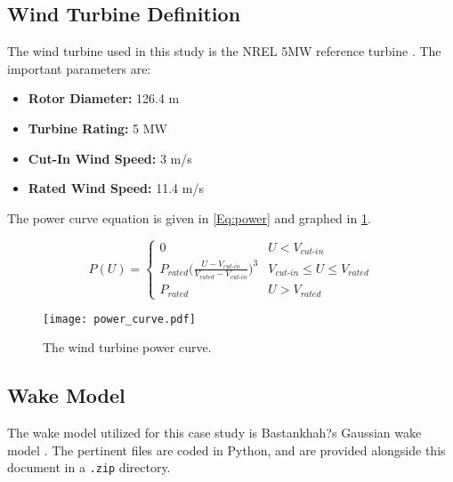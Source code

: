 \documentclass[12pt]{article}
\begin{document}
\subsection{Wind Turbine Definition}
    The wind turbine used in this study is the NREL 5MW reference turbine \cite{5MW}. The important parameters are:
    
    \begin{itemize}
        \item \textbf{Rotor Diameter:} 126.4 m
        \item \textbf{Turbine Rating:} 5 MW
        \item \textbf{Cut-In Wind Speed:} 3 m/s
        \item \textbf{Rated Wind Speed:} 11.4 m/s
    \end{itemize}
    
    \noindent The power curve equation is given in \cref{Eq:power} and graphed in \cref{Fig:curve}.
    
    \begin{equation}
        P(U) = 
            \begin{cases} 
                  0 & U < V_{\textit{cut-in}} \\
                  P_{\textit{rated}}\bigg(\frac{U-V_{\textit{cut-in}}}{V_{\textit{rated}}-V_{\textit{cut-in}}}\bigg)^3 & V_{\textit{cut-in}}\leq U \leq V_{\textit{rated}} \\
                  P_{\textit{rated}} & U > V_{\textit{rated}}
            \end{cases}
        \label{Eq:power}
    \end{equation}
    
    \begin{figure}[H]
        \begin{centering}
        \texttt{[image: power\_curve.pdf]}
        \caption{The wind turbine power curve. \label{Fig:curve}}
        \end{centering}
    \end{figure}

\subsection{Wake Model}
The wake model utilized for this case study is Bastankhah?s Gaussian wake model \cite{Bastankhah2014, Bastankhah2016}. The pertinent files are coded in Python, and are provided alongside this document in a \texttt{.zip} directory.
\end{document}
